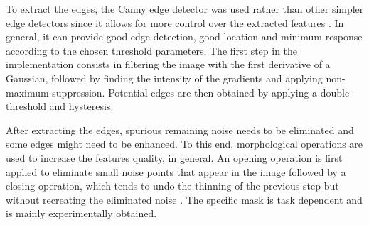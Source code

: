 \documentclass[conference]{IEEEtran}
\begin{document}
To extract the edges, the Canny edge detector was used rather than other simpler edge detectors since it allows for more control over the extracted features \cite{bao2005canny}. In general, it can provide good edge detection, good location and minimum response according to the chosen threshold parameters. The first step in the implementation consists in filtering the image with the first derivative of a Gaussian, followed by finding the intensity of the gradients and applying non-maximum suppression. Potential edges are then obtained by applying a double threshold and hysteresis.

After extracting the edges, spurious remaining noise needs to be eliminated and some edges might need to be enhanced. To this end, morphological operations are used to increase the features quality, in general. An opening operation is first applied to eliminate small noise points that appear in the image followed by a closing operation, which tends to undo the thinning of the previous step but without recreating the eliminated noise \cite{lybanon1994segmentation}. The specific mask is task dependent and is mainly experimentally obtained.
\end{document}
